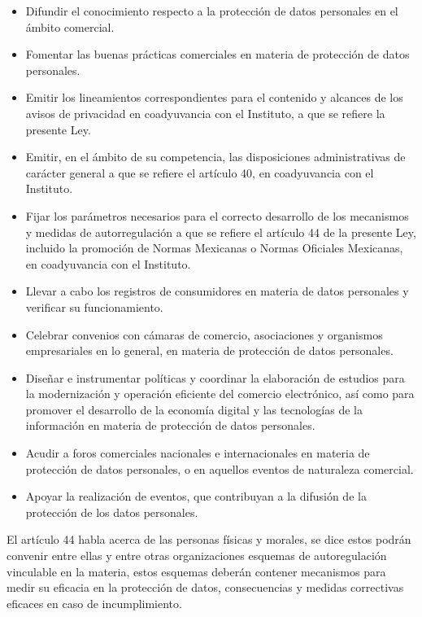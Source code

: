 \documentclass[runningheads,a4paper]{llncs}
\begin{document}
\begin{itemize}
	\item Difundir el conocimiento respecto a la protección de datos personales en el ámbito comercial.
	\item Fomentar las buenas prácticas comerciales en materia de protección de datos personales.
	\item Emitir los lineamientos correspondientes para el contenido y alcances de los avisos de
privacidad en coadyuvancia con el Instituto, a que se refiere la presente Ley.
	\item Emitir, en el ámbito de su competencia, las disposiciones administrativas de carácter general a
que se refiere el artículo 40, en coadyuvancia con el Instituto.
	\item Fijar los parámetros necesarios para el correcto desarrollo de los mecanismos y medidas de
autorregulación a que se refiere el artículo 44 de la presente Ley, incluido la promoción de
Normas Mexicanas o Normas Oficiales Mexicanas, en coadyuvancia con el Instituto.
	\item Llevar a cabo los registros de consumidores en materia de datos personales y verificar su
funcionamiento.
	\item Celebrar convenios con cámaras de comercio, asociaciones y organismos empresariales en lo
general, en materia de protección de datos personales.
	\item Diseñar e instrumentar políticas y coordinar la elaboración de estudios para la modernización y
operación eficiente del comercio electrónico, así como para promover el desarrollo de la
economía digital y las tecnologías de la información en materia de protección de datos
personales.
	\item Acudir a foros comerciales nacionales e internacionales en materia de protección de datos
personales, o en aquellos eventos de naturaleza comercial.
	\item Apoyar la realización de eventos, que contribuyan a la difusión de la protección de los datos
personales.
\end{itemize}

El artículo 44 habla acerca de las personas físicas y morales, se dice estos podrán convenir entre ellas y entre otras organizaciones esquemas de autoregulación vinculable en la materia, estos esquemas deberán contener mecanismos para medir su eficacia en la protección de datos, consecuencias y medidas correctivas eficaces en caso de incumplimiento.\\
\end{document}
